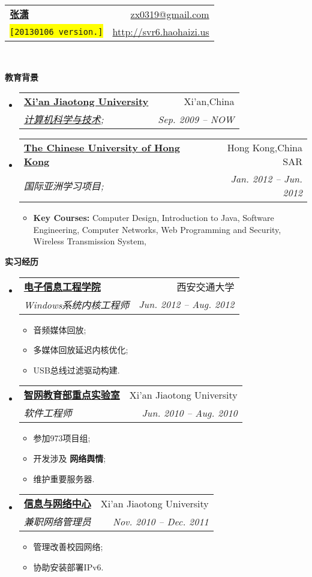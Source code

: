 \documentclass[letterpaper,11pt]{article}
\makeatletter
\newcommand{\resitem}[1]{\item #1 \vspace{-2pt}}
\newcommand{\resheading}[1]{{\large \colorbox{mygrey}{\begin{minipage}{\textwidth}{\textbf{#1 \vphantom{p\^{E}}}}\end{minipage}}}}
\newcommand{\ressubheading}[4]{
\begin{tabular*}{6.5in}{l@{\extracolsep{\fill}}r}
		\textbf{#1} & #2 \\
		\textit{#3} & \textit{#4} \\
\end{tabular*}\vspace{-6pt}}
\makeatother
\begin{document}
\begin{CJK}{UTF8}{gbsn}

\newcommand{\mywebheader}{
\begin{tabular*}{7in}{l@{\extracolsep{\fill}}r}
	\textbf{\href{http://svr6.haohaizi.us/}{\LARGE 张潇}} & \href{mailto:zx0319@gmail.com}{zx0319@gmail.com}\\
	{\footnotesize \texttt{\colorbox{yellow}{[20130106 version.]}}} & \href{http://svr6.haohaizi.us}{http://svr6.haohaizi.us} \\
	\end{tabular*}
\\
\vspace{0.1in}}

\mywebheader

\resheading{教育背景}
	\begin{itemize}
		\item
			\ressubheading{\href{http://www.xjtu.edu.cn}{Xi'an Jiaotong University}}{Xi'an,China}{\href{http://www.cs.xjtu.edu.cn}{计算机科学与技术};}{Sep. 2009 -- NOW}
			
		\item
			\ressubheading{\href{http://www.cuhk.edu.hk}{The Chinese University of Hong Kong}}{Hong Kong,China SAR}{{国际亚洲学习项目};}{Jan. 2012 -- Jun. 2012}
				{ \footnotesize
				\begin{itemize}
					\resitem
					{\textbf{Key Courses:}
						{Computer Design},
						{Introduction to Java},
						{Software Engineering},
						{Computer Networks},
						{Web Programming and Security},
						{Wireless Transmission System},
					}
				\end{itemize}
			}
	\end{itemize} %

\resheading{实习经历}
	\begin{itemize}
		\item 
			\ressubheading{\href{http://eie.xjtu.edu.cn/}{电子信息工程学院}}{西安交通大学}{Windows系统内核工程师}{Jun. 2012 -- Aug. 2012}
				{ \footnotesize
				\begin{itemize}
					\resitem{音频媒体回放;}
					\resitem{多媒体回放延迟内核优化;}
					\resitem{USB总线过滤驱动构建.}
				\end{itemize}
				}
		\item 
			\ressubheading{\href{http://nskeylab.xjtu.edu.cn/}{智网教育部重点实验室}}{Xi'an Jiaotong University}{软件工程师}{Jun. 2010 -- Aug. 2010}
				{ \footnotesize
				\begin{itemize}
					\resitem{参加973项目组;}
					\resitem{开发涉及 \textbf{网络舆情};}
					\resitem{维护重要服务器.}
				\end{itemize}
				}
		\item
			\ressubheading{\href{http://nic.xjtu.edu.cn}{信息与网络中心}}{Xi'an Jiaotong University}{兼职网络管理员}{Nov. 2010 -- Dec. 2011}
				{ \footnotesize
				\begin{itemize}
					\resitem{管理改善校园网络;}
					\resitem{协助安装部署IPv6.}
				\end{itemize}
          		}
	\end{itemize}
	

\end{CJK}
\end{document}
